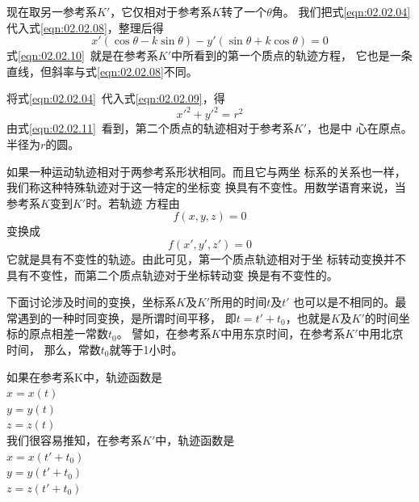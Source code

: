现在取另一参考系$K'$，它仅相对于参考系$K$转了一个$\theta$角。
我们把式\eqref{eqn:02.02.04}代入式\eqref{eqn:02.02.08}，整理后得
{\setlength{\mathindent}{4em}
\begin{equation}\label{eqn:02.02.10}
  x'\left(\cos\theta - k\sin\theta\right)-y'\left(\sin\theta + k\cos\theta\right)=0
\end{equation}}%
式\eqref{eqn:02.02.10}~就是在参考系$K'$中所看到的第一个质点的轨迹方程，
它也是一条直线，但斜率与式\eqref{eqn:02.02.08}不同。

将式\eqref{eqn:02.02.04}~代入式\eqref{eqn:02.02.09}，得
\begin{equation}\label{eqn:02.02.11}
  x'^2+y'^2=r^2
\end{equation}
由式\eqref{eqn:02.02.11}~看到，第二个质点的轨迹相对于参考系$K'$，也是中
心在原点。半径为$r$的圆。

如果一种运动轨迹相对于两参考系形状相同。而且它与两坐
标系的关系也一样，我们称这种特殊轨迹对于这一特定的坐标变
换具有不变性。用数学语育来说，当参考系$K$变到$K'$时。若轨迹
方程由
\begin{equation*}
  f\left(x,y,z\right)=0
\end{equation*}
变换成
\begin{equation*}
  f\left(x',y',z'\right)=0
\end{equation*}
它就是具有不变性的轨迹。由此可见，第一个质点轨迹相对于坐
标转动变换并不具有不变性，而第二个质点轨迹对于坐标转动变
换是有不变性的。

下面讨论涉及时间的变换，坐标系$K$及$K'$所用的时间$t$及$t'$
也可以是不相同的。最常遇到的一种时同变换，是所谓时间平移，
即$t=t'+t_0$，也就是$K$及$K'$的时间坐标的原点相差一常数$t_0$。
譬如，在参考系$K$中用东京时间，在参考系$K'$中用北京时间，
那么，常数$t_0$就等于1小时。

如果在参考系K中，轨迹函数是\vspace{-0.2em}
\\\null\hspace{6em}$x=x\left(t\right)$
\\\null\hspace{6em}$y=y\left(t\right)$
\\\null\hspace{6em}$z=z\left(t\right)$\\
我们很容易推知，在参考系$K'$中，轨迹函数是\vspace{-0.2em}
\\\null\hspace{6em}$x=x\left(t'+t_0\right)$
\\\null\hspace{6em}$y=y\left(t'+t_0\right)$
\\\null\hspace{6em}$z=z\left(t'+t_0\right)$

